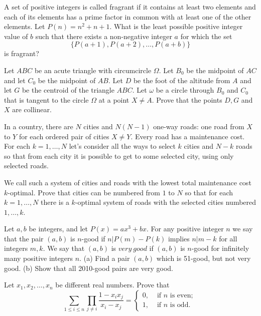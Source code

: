 \documentclass[11pt]{scrartcl}
\begin{document}
\begin{problem}[403529216204023]
A set of positive integers is called fragrant if it contains at least two elements and each of its elements has a prime factor in common with at least one of the other elements. Let $P(n)=n^2+n+1$. What is the least possible positive integer value of $b$ such that there exists a non-negative integer $a$ for which the set$$\{P(a+1),P(a+2),\ldots,P(a+b)\}$$is fragrant?
\end{problem}
\begin{problem}[120105730464462]
	Let $ABC$ be an acute triangle with circumcircle $\Omega$. Let $B_0$ be the midpoint of $AC$ and let $C_0$ be the midpoint of $AB$. Let $D$ be the foot of the altitude from $A$ and let $G$ be the centroid of the triangle $ABC$. Let $\omega$ be a circle through $B_0$ and $C_0$ that is tangent to the circle $\Omega$ at a point $X\not= A$. Prove that the points $D,G$ and $X$ are collinear.
\end{problem}
\begin{problem}[437956241529021]
	In a country, there are ${}N{}$ cities and $N(N-1)$ one-way roads: one road from $X{}$ to $Y{}$ for each ordered pair of cities $X \neq Y$. Every road has a maintenance cost. For each $k = 1,\ldots, N$ let's consider all the ways to select $k{}$ cities and $N - k{}$ roads so that from each city it is possible to get to some selected city, using only selected roads.

We call such a system of cities and roads with the lowest total maintenance cost $k{}$-optimal. Prove that cities can be numbered from $1{}$ to $N{}$ so that for each $k = 1,\ldots, N$ there is a $k{}$-optimal system of roads with the selected cities numbered $1,\ldots, k$.
\end{problem}
\begin{problem}[1159469125385582912]
	Let $a, b$ be integers, and let $P(x) = ax^3+bx.$ For any positive integer $n$ we say that the pair $(a,b)$ is $n$-good if $n | P(m)-P(k)$ implies $n | m - k$ for all integers $m, k.$ We say that $(a,b)$ is $very \ good$ if $(a,b)$ is $n$-good for infinitely many positive integers $n.$
(a) Find a pair $(a,b)$ which is 51-good, but not very good.
(b) Show that all 2010-good pairs are very good.
\end{problem}
\begin{problem}[443006607452241]
Let $x_1, x_2, \dots, x_n$ be different real numbers. Prove that
\[\sum_{1 \leqslant i \leqslant n} \prod_{j \neq i} \frac{1-x_{i} x_{j}}{x_{i}-x_{j}}=\left\{\begin{array}{ll}
0, & \text { if } n \text { is even; } \\
1, & \text { if } n \text { is odd. }
\end{array}\right.\]
\end{problem}
\end{document}
